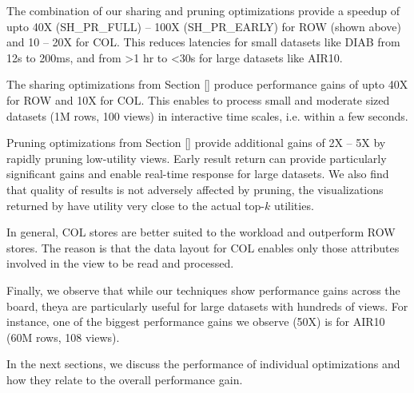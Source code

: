 \begin{denselist} 
\item The combination of our sharing and pruning optimizations provide a speedup of upto 40X (SH\_PR\_FULL) -- 100X (SH\_PR\_EARLY) for ROW (shown above) and 10 -- 20X for COL.
This reduces latencies for small datasets like DIAB from 12s to 200ms, and from >1 hr to <30s for large datasets like AIR10.
\item The sharing optimizations from Section \ref{} produce performance gains of upto 40X for ROW and 10X for COL. This enables \SeeDB to process small and moderate sized datasets (1M rows, 100 views) in interactive time scales, i.e. within a few seconds.
\item Pruning optimizations from Section \ref{} provide additional gains of 2X -- 5X by rapidly pruning low-utility views. Early result return can provide particularly significant gains and enable real-time response for large datasets. We also find that quality of results is not adversely affected by pruning, the visualizations returned by \SeeDB have utility very close to the actual top-$k$ utilities.
\item In general, COL stores are better suited to the \SeeDB workload and outperform ROW stores. The reason is that the data layout for COL enables only those attributes involved in the view to be read and processed. 
\item Finally, we observe that while our techniques show performance gains across the board, theya are particularly useful for large datasets with hundreds of views. For instance, one of the biggest performance gains we observe (50X) is for AIR10 (60M rows, 108 views).
\end{denselist}

In the next sections, we discuss the performance of individual optimizations and how they relate to the overall performance gain.




